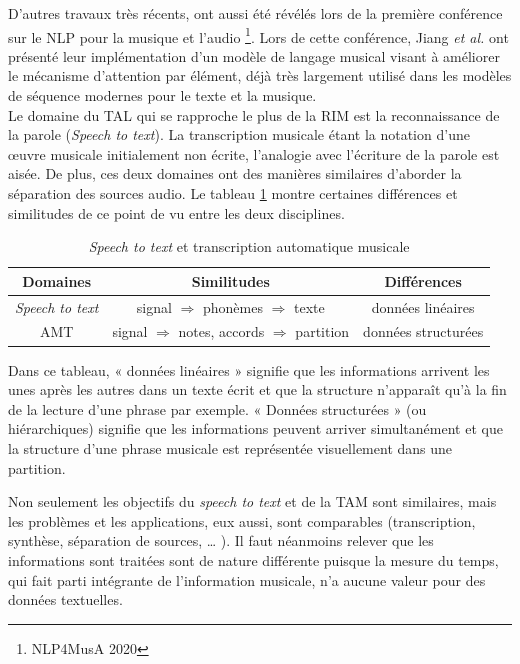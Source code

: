 D’autres travaux très récents, ont aussi été révélés lors de la première
conférence sur le NLP pour la musique et l’audio \footnote{NLP4MusA 2020}. Lors
de cette conférence, Jiang \textit{et al.} \cite{Jiang2020DiscoveringMR} ont
présenté leur implémentation d’un modèle de langage musical visant à améliorer
le mécanisme d’attention par élément, déjà très largement utilisé dans les
modèles de séquence modernes pour le texte et la musique.\\

Le domaine du TAL qui se rapproche le plus de la RIM est la reconnaissance de
la parole (\textit{Speech to text}). La transcription musicale étant la notation d’une
œuvre musicale initialement non écrite, l’analogie avec l’écriture de la parole
est aisée. De plus, ces deux domaines ont des manières similaires d’aborder
la séparation des sources audio. Le tableau \ref{spToTxt_vs_TAM} montre
certaines différences et similitudes de ce point de vu entre les deux
disciplines.

\begin{table}[h]
	\centering
	\begin{tabular}{|c|c|c|} \hline
	Domaines & Similitudes & Différences \\ \hline
	\textit{Speech to text} & signal $\Rightarrow$ phonèmes $\Rightarrow$
    texte & données linéaires \footnotemark\\
	AMT & signal $\Rightarrow$ notes, accords $\Rightarrow$ partition & données
    structurées\footnotemark\\ \hline
	\end{tabular}
	\caption{\textit{Speech to text} et transcription automatique musicale}
	\label{spToTxt_vs_TAM}
\end{table}
Dans ce tableau, « données linéaires » signifie que les informations arrivent
les unes après les autres dans un texte écrit et que la structure n’apparaît
qu’à la fin de la lecture d’une phrase par exemple. « Données structurées » (ou
hiérarchiques) signifie que les informations peuvent arriver simultanément et
que la structure d’une phrase musicale est représentée visuellement dans une
partition.

Non seulement les objectifs du \textit{speech to text} et de la TAM sont
similaires, mais les problèmes et les applications, eux aussi, sont comparables
(transcription, synthèse, séparation de sources, … ). Il faut néanmoins relever
que les informations sont traitées sont de nature différente puisque la mesure
du temps, qui fait parti intégrante de l’information musicale, n’a aucune
valeur pour des données textuelles.

